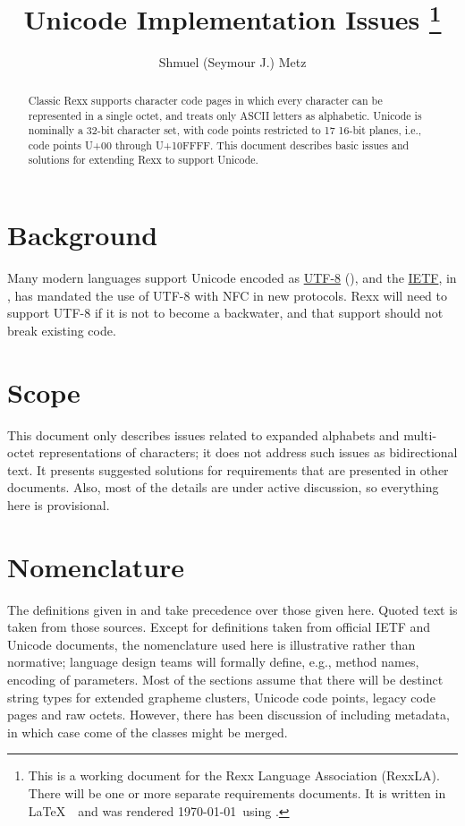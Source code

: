 \documentclass[b4paper]{article}
\title{Unicode Implementation Issues%
  \thanks
    {
    This is a working document for the Rexx Language Association (RexxLA).
    There will be one or more separate requirements documents.
    It is written in \LaTeX\ \fmtversion\ and was rendered \today\ using \enginedetails.
    }
  }
\author{Shmuel (Seymour J.) Metz}
\begin{document}

\maketitle

\begin{abstract}
Classic Rexx supports character code pages in which every character can be represented in a single octet,
and treats only ASCII letters as alphabetic.
Unicode is nominally a 32-bit character set, with code points restricted to 17 16-bit planes,
i.e., code points U+00 through U+10FFFF.
This document describes basic issues and solutions for extending Rexx to support Unicode.
\end{abstract}


\section{Background}
Many modern languages support Unicode encoded as
\href{https://datatracker.ietf.org/doc/rfc3629/}{UTF-8} (\cite{RFC 3629}),
and the \href{https://www.ietf.org/}{IETF}, in \cite{RFC 5198},
has mandated the use of UTF-8 with NFC in new protocols.
Rexx will need to support UTF-8 if it is not to become a backwater,
and that support should not break existing code.


\section{Scope}
This document only describes issues related to expanded alphabets and multi-octet representations of characters;
it does not address such issues as bidirectional text.
It presents suggested solutions for requirements that are presented in other documents.
Also, most of the details are under active discussion, so everything here is provisional.


\section{Nomenclature}

The definitions given in \cite{Glossary} and \cite{Unicode} take
precedence over those given here. Quoted text is taken from those sources.
Except for definitions taken from official IETF and Unicode documents,
the nomenclature used here is illustrative rather than normative;
language design teams will formally define, e.g., method names, encoding of parameters.
Most of the sections assume that there will be destinct string types
for extended grapheme clusters, Unicode code points, legacy code pages
and raw octets. However, there has been discussion of including
metadata, in which case come of the classes might be merged.
\end{document}
